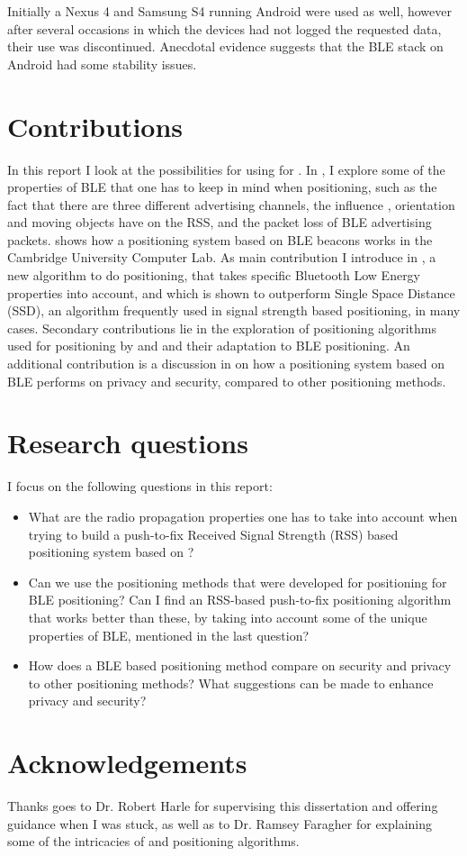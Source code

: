 Initially a Nexus 4 and Samsung S4 running Android were used as well, however after several occasions in which the devices had not logged the requested data, their use was discontinued.
Anecdotal evidence suggests that the BLE stack on Android had some stability issues.

\section{Contributions}

In this report I look at the possibilities for using \BLE for \ptfp.
In , I explore some of the properties of BLE that one has to keep in mind when positioning, such as the fact that there are three different advertising channels, the influence \mpi, orientation and moving objects have on the RSS, and the packet loss of BLE advertising packets.
 shows how a positioning system based on BLE beacons works in the Cambridge University Computer Lab.
As main contribution I introduce  in , a new algorithm to do positioning, that takes specific Bluetooth Low Energy properties into account, and which is shown to outperform Single Space Distance (SSD), an algorithm frequently used in signal strength based positioning, in many cases.
Secondary contributions lie in the exploration of positioning algorithms used for \wifi positioning by \citet{bahl2000radar} and \citet{king2006compass} and their adaptation to BLE positioning.
An additional contribution is a discussion in  on how a positioning system based on BLE performs on privacy and security, compared to other positioning methods.

\section{Research questions}
I focus on the following questions in this report:
\begin{itemize}
    \item What are the radio propagation properties one has to take into account when trying to build a push-to-fix Received Signal Strength (RSS) based positioning system based on \BLE?
    \item Can we use the positioning methods that were developed for \wifi positioning for BLE positioning? Can I find an RSS-based push-to-fix positioning algorithm that works better than these, by taking into account some of the unique properties of BLE, mentioned in the last question?
    \item How does a BLE based positioning method compare on security and privacy to other positioning methods? What suggestions can be made to enhance privacy and security?
\end{itemize}

\section{Acknowledgements}
Thanks goes to Dr. Robert Harle for supervising this dissertation and offering guidance when I was stuck, as well as to Dr. Ramsey Faragher for explaining some of the intricacies of \mpp and positioning algorithms.

